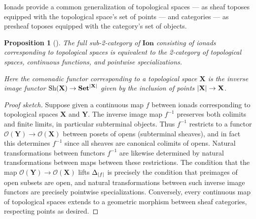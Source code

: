 \documentclass[11pt, oneside, article]{memoir}
\theoremstyle{plain}
\newtheorem{proposition}[theorem]{Proposition}
\theoremstyle{definition}
\theoremstyle{remark}
\DeclareMathOperator{\Sh}{Sh}
\DeclarePairedDelimiter{\abs}{\lvert}{\rvert}
\newcommand{\namedcat}[1]{\mathbf{#1}}
\newcommand{\spa}[1]{\mathbf{#1}}
\newcommand{\Set}{\namedcat{Set}}
\newcommand{\pts}[1]{{\abs{#1}}}
\newcommand{\one}[1]{\pts{#1}}
\newcommand{\reindex}[1]{\Delta_{#1}}
\newcommand{\conion}[1]{{#1}^{-1}}
\newcommand{\Ionad}{\namedcat{Ion}}
\newcommand{\xX}{X}
\newcommand{\xY}{Y}
\newcommand{\tX}{\spa{X}}
\newcommand{\tY}{\spa{Y}}
\newcommand{\opens}[1]{\mathcal{O}(#1)}
\begin{document}



Ionads provide a common generalization of topological spaces --- as
sheaf toposes equipped with the topological space's set of points ---
and categories --- as presheaf toposes equipped with the category's
set of objects.



\begin{proposition}[{\cite[Example 4.8]{garner:ionads}}]\label{prop:topionad}
  The full sub-2-category of $\Ionad$ consisting of ionads
  corresponding to topological spaces is equivalent to the 2-category
  of topological spaces, continuous functions, and pointwise
  specializations.
  
  Here the comonadic functor corresponding to a topological space
  $\tX$ is the inverse image functor $\Sh(\tX) \to \Set^{\pts{\tX}}$
  given by the inclusion of points $\pts{\tX} \to \tX$.
\end{proposition}


\begin{proof}[Proof sketch]
  Suppose given a continuous map $f$ between ionads corresponding to
  topological spaces $\tX$ and $\tY$. The inverse image map $\conion{f}$
  preserves both colimits and finite limits, in particular subterminal
  objects. Thus $\conion{f}$ restricts to a functor
  $\opens{\tY} \to \opens{\tX}$ between posets of opens (subterminal
  sheaves), and in fact this determines $\conion{f}$ since all sheaves
  are canonical colimits of opens.
  Natural transformations between functors $\conion{f}$ are likewise
  determined by natural transformations between maps between these
  restrictions. The condition that the map
  $\opens{\tY} \to \opens{\tX}$ lifts $\reindex{\one{f}}$ is precisely
  the condition that preimages of open subsets are open, and natural
  transformations between such inverse image functors are precisely
  pointwise specializations.  Conversely, every continuous map of
  topological spaces extends to a geometric morphism between sheaf
  categories, respecting points as desired.
\end{proof}
\end{document}

